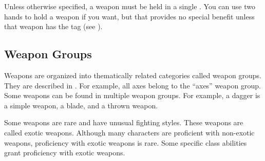  Unless otherwise specified, a weapon must be held in a single .
  You can use two hands to hold a weapon if you want, but that provides no special benefit unless that weapon has the  tag (see ).

  \subsection{Weapon Groups}\label{Weapon Groups}
    Weapons are organized into thematically related categories called weapon groups. They are described in . For example, all axes belong to the ``axes'' weapon group. Some weapons can be found in multiple weapon groups. For example, a dagger is a simple weapon, a blade, and a thrown weapon.

     Some weapons are rare and have unusual fighting styles.
    These weapons are called exotic weapons.
    Although many characters are proficient with non-exotic weapons, proficiency with exotic weapons is rare.
    Some specific class abilities grant proficiency with exotic weapons.

